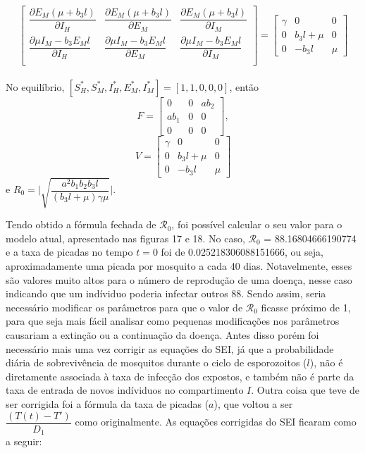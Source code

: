 \documentclass[12pt]{article}
\begin{document}
\begin{itemize}
$$\begin{bmatrix}
\dfrac{\partial E_M (\mu + b_3 l)}{\partial I_H} & \dfrac{\partial E_M (\mu + b_3 l)}{\partial E_M} & \dfrac{\partial E_M (\mu + b_3 l)}{\partial I_M}\\
\dfrac{\partial \mu I_M - b_3 E_M l}{\partial I_H} & \dfrac{\partial \mu I_M - b_3 E_M l}{\partial E_M} & \dfrac{\partial \mu I_M - b_3 E_M l}{\partial I_M}\\
\end{bmatrix} = 
\begin{bmatrix}
\gamma & 0 & 0\\
0 & b_3l+\mu & 0\\
0 & -b_3l & \mu
\end{bmatrix}$$
\\No equilíbrio, $[S_H^*, S_M^*, I_H^*, E_M^*, I_M^*] = [1,1,0,0,0]$, então $$F=\begin{bmatrix}
0 & 0 & ab_2\\
ab_1 & 0 & 0\\
0 & 0 & 0
\end{bmatrix},$$
$$V = \begin{bmatrix}
\gamma & 0 & 0\\
0 & b_3l+\mu & 0\\
0 & -b_3l & \mu
\end{bmatrix}$$ 
e $R_0 = \Big | \sqrt{\dfrac{a^2 b_1 b_2 b_3 l}{(b_3 l + \mu)\gamma \mu}}\Big | $.

\end{itemize}
Tendo obtido a fórmula fechada de $\mathcal{R}_0$, foi possível calcular o seu valor para o modelo atual, apresentado nas figuras 17 e 18. No caso, $\mathcal{R}_0$ = 88.16804666190774
e a taxa de picadas no tempo $t=0$ foi de 0.025218306088151666, ou seja, aproximadamente uma picada por mosquito a cada 40 dias. Notavelmente, esses são valores muito altos para o número de reprodução de uma doença, nesse caso indicando que um indíviduo poderia infectar outros 88. Sendo assim, seria necessário modificar os parâmetros para que o valor de $\mathcal{R}_0$ ficasse próximo de 1, para que seja mais fácil analisar como pequenas modificações nos parâmetros causariam a extinção ou a continuação da doença. Antes disso porém foi necessário mais uma vez corrigir as equações do SEI, já que a probabilidade diária de sobrevivência de mosquitos durante o ciclo de esporozoitos ($l$), não é diretamente associada à taxa de infecção dos expostos, e também não é parte da taxa de entrada de novos indíviduos no compartimento $I$. Outra coisa que teve de ser corrigida foi a fórmula da taxa de picadas ($a$), que voltou a ser $\dfrac{(T(t) - T')}{D_1}$ como originalmente. As equações corrigidas do SEI ficaram como a seguir:
\end{document}
